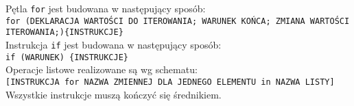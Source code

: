\documentclass{article}
\begin{document}
Pętla \texttt{for} jest budowana w następujący sposób: \\
\texttt{for (DEKLARACJA WARTOŚCI DO ITEROWANIA; WARUNEK KOŃCA; ZMIANA WARTOŚCI ITEROWANIA;)\{INSTRUKCJE\}}\\

Instrukcja \texttt{if} jest budowana w następujący sposób: \\
\texttt{if (WARUNEK) \{INSTRUKCJE\}} \\

Operacje listowe realizowane są wg schematu: \\
\texttt{[INSTRUKCJA for NAZWA ZMIENNEJ DLA JEDNEGO ELEMENTU in NAZWA LISTY]} \\

Wszystkie instrukcje muszą kończyć się średnikiem.
\end{document}
